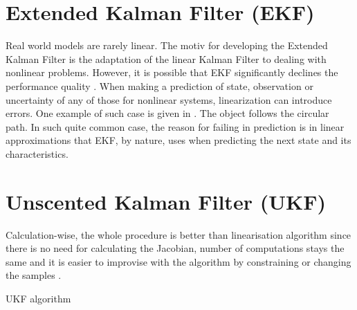 \section{Extended Kalman Filter (EKF)}

Real world models are rarely linear. The motiv for developing the Extended Kalman Filter is the adaptation of the linear Kalman Filter to dealing with nonlinear problems. However, it is possible that EKF significantly declines the performance quality \cite{julier96}. When making a prediction of state, observation or uncertainty of any of those for nonlinear systems, linearization can introduce errors. One example of such case is given in \cite{julier96}. The object follows the circular path. In such quite common case, the reason for failing in prediction is in linear approximations that EKF, by nature, uses when predicting the next state and its characteristics.

\section{Unscented Kalman Filter (UKF)}
Calculation-wise, the whole procedure is better than linearisation algorithm since there is no need for calculating the Jacobian, number of computations stays the same and it is easier to improvise with the algorithm by constraining or changing the samples \cite{julier96}.
\begin{algorithm}
\caption{UKF algorithm}
\label{alg:ukf}                   
\end{algorithm}